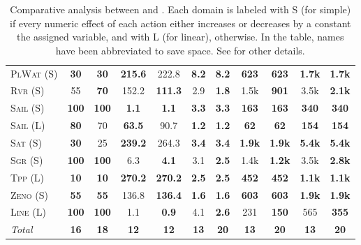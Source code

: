 \documentclass[11pt,landscape]{article}
\begin{document}
\begin{table*}[tb]
{\begin{tabular}{|l||cc||cc||cc||cc||cc||}
\textsc{PlWat} (S)&\textbf{30}&\textbf{30}&\textbf{215.6}&222.8&\textbf{8.2}&\textbf{8.2}&\textbf{623}&\textbf{623}&\textbf{1.7k}&\textbf{1.7k}\\
\textsc{Rvr} (S)&55&\textbf{70}&152.2&\textbf{111.3}&2.9&\textbf{1.8}&1.5k&\textbf{901}&3.5k&\textbf{2.1k}\\
\textsc{Sail} (S)&\textbf{100}&\textbf{100}&\textbf{1.1}&\textbf{1.1}&\textbf{3.3}&\textbf{3.3}&\textbf{163}&\textbf{163}&\textbf{340}&\textbf{340}\\
\textsc{Sail} (L)&\textbf{80}&70&\textbf{63.5}&90.7&\textbf{1.2}&\textbf{1.2}&\textbf{62}&\textbf{62}&\textbf{154}&\textbf{154}\\
\textsc{Sat} (S)&\textbf{30}&25&\textbf{239.2}&264.3&\textbf{3.4}&\textbf{3.4}&\textbf{1.9k}&\textbf{1.9k}&\textbf{5.4k}&\textbf{5.4k}\\
\textsc{Sgr} (S)&\textbf{100}&\textbf{100}&6.3&\textbf{4.1}&3.1&\textbf{2.5}&1.4k&\textbf{1.2k}&3.5k&\textbf{2.8k}\\
\textsc{Tpp} (L)&\textbf{10}&\textbf{10}&\textbf{270.2}&\textbf{270.2}&\textbf{2.5}&\textbf{2.5}&\textbf{452}&\textbf{452}&\textbf{1.1k}&\textbf{1.1k}\\
\textsc{Zeno} (S)&\textbf{55}&\textbf{55}&136.8&\textbf{136.4}&\textbf{1.6}&\textbf{1.6}&\textbf{603}&\textbf{603}&\textbf{1.9k}&\textbf{1.9k}\\
\textsc{Line} (L)&\textbf{100}&\textbf{100}&1.1&\textbf{0.9}&4.1&\textbf{2.6}&231&\textbf{150}&565&\textbf{355}
\\\hline
\textit{Total}&\textbf{16}&\textbf{18}&\textbf{12}&\textbf{12}&\textbf{13}&\textbf{20}&\textbf{13}&\textbf{20}&\textbf{13}&\textbf{20}\\\hline

        \end{tabular}}
        \caption{Comparative analysis between  \pattya and \pattye. Each domain is labeled with S (for simple) if every numeric effect of each action either increases or decreases by a constant the assigned variable, and with L (for linear), otherwise. In the table, names have been abbreviated to save space.  See \cite{ipc2023} for other details.}
        \label{tab:exp-patty-a-patty-e}
        \end{table*}
        
\end{document}
